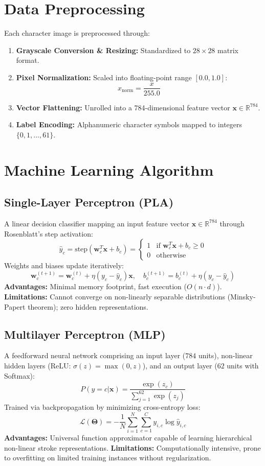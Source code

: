 \documentclass[12pt,a4paper]{article}
\begin{document}
\section{Data Preprocessing}
Each character image is preprocessed through:
\begin{enumerate}[noitemsep]
    \item \textbf{Grayscale Conversion \& Resizing:} Standardized to $28 \times 28$ matrix format.
    \item \textbf{Pixel Normalization:} Scaled into floating-point range $[0.0, 1.0]$:
    $$x_{\text{norm}} = \frac{x}{255.0}$$
    \item \textbf{Vector Flattening:} Unrolled into a 784-dimensional feature vector $\mathbf{x} \in \mathbb{R}^{784}$.
    \item \textbf{Label Encoding:} Alphanumeric character symbols mapped to integers $\{0, 1, \dots, 61\}$.
\end{enumerate}

\section{Machine Learning Algorithm}
\subsection{Single-Layer Perceptron (PLA)}
A linear decision classifier mapping an input feature vector $\mathbf{x} \in \mathbb{R}^{784}$ through Rosenblatt's step activation:
$$\hat{y}_c = \text{step}(\mathbf{w}_c^T \mathbf{x} + b_c) = \begin{cases} 1 & \text{if } \mathbf{w}_c^T \mathbf{x} + b_c \ge 0 \\ 0 & \text{otherwise} \end{cases}$$
Weights and biases update iteratively:
$$\mathbf{w}_{c}^{(t+1)} = \mathbf{w}_c^{(t)} + \eta (y_c - \hat{y}_c) \mathbf{x}, \quad b_c^{(t+1)} = b_c^{(t)} + \eta (y_c - \hat{y}_c)$$
\textbf{Advantages:} Minimal memory footprint, fast execution ($O(n \cdot d)$). \textbf{Limitations:} Cannot converge on non-linearly separable distributions (Minsky-Papert theorem); zero hidden representations.

\subsection{Multilayer Perceptron (MLP)}
A feedforward neural network comprising an input layer ($784$ units), non-linear hidden layers (ReLU: $\sigma(z) = \max(0, z)$), and an output layer ($62$ units with Softmax):
$$P(y=c|\mathbf{x}) = \frac{\exp(z_c)}{\sum_{j=1}^{62} \exp(z_j)}$$
Trained via backpropagation by minimizing cross-entropy loss:
$$\mathcal{L}(\mathbf{\Theta}) = -\frac{1}{N} \sum_{i=1}^N \sum_{c=1}^C y_{i,c} \log \hat{y}_{i,c}$$
\textbf{Advantages:} Universal function approximator capable of learning hierarchical non-linear stroke representations. \textbf{Limitations:} Computationally intensive, prone to overfitting on limited training instances without regularization.
\end{document}
